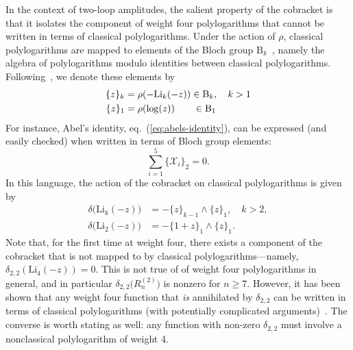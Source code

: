 \documentclass[12pt]{article}
\def\x{\mathcal{X}}
\begin{document}
In the context of two-loop amplitudes, the salient property of the cobracket is that it isolates the component of weight four polylogarithms that cannot be written in terms of classical polylogarithms. Under the action of $\rho$, classical polylogarithms are mapped to elements of the Bloch group $\text{B}_k$~\cite{Bloch:2000, Suslin:1990}, namely the algebra of polylogarithms modulo identities between classical polylogarithms. Following~\cite{Golden:2013xva}, we denote these elements by
\begin{align}
 \{ z \}_k  &= \rho(-\text{Li}_k(-z)) \in \text{B}_k, \quad k>1 \\
 \{ z \}_1  &= \rho(\log(z)) \hspace{.675cm} \in \text{B}_1
\end{align}
For instance, Abel's identity, eq.~(\ref{eq:abels-identity}), can be expressed (and easily checked) when written in terms of Bloch group elements:
\begin{equation}
	\sum_{i=1}^5 \{\x_i\}_2 = 0.
\end{equation}
In this language, the action of the cobracket on classical polylogarithms is given by
\begin{align}
\delta \big( \text{Li}_k(-z) \big) &= - \{ z \}_{k-1} \wedge \{ z \}_1 , \quad k>2 , \\
\delta \big( \text{Li}_2(-z) \big) &= - \{ 1 + z \}_{1} \wedge \{ z \}_1.
\end{align}
Note that, for the first time at weight four, there exists a component of the cobracket that is not mapped to by classical polylogarithms---namely, $\delta_{2,2}(\text{Li}_4(-z))=0$. This is not true of of weight four polylogarithms in general, and in particular $\delta_{2,2} \big(R_n^{(2)} \big)$ is nonzero for $n\ge7$. However, it has been shown that any weight four function that \emph{is} annihilated by $\delta_{2,2}$ can be written in terms of classical polylogarithms (with potentially complicated arguments)~\cite{G91a}. The converse is worth stating as well: any function with non-zero $\delta_{2,2}$ must involve a nonclassical polylogarithm of weight 4. 
\end{document}
